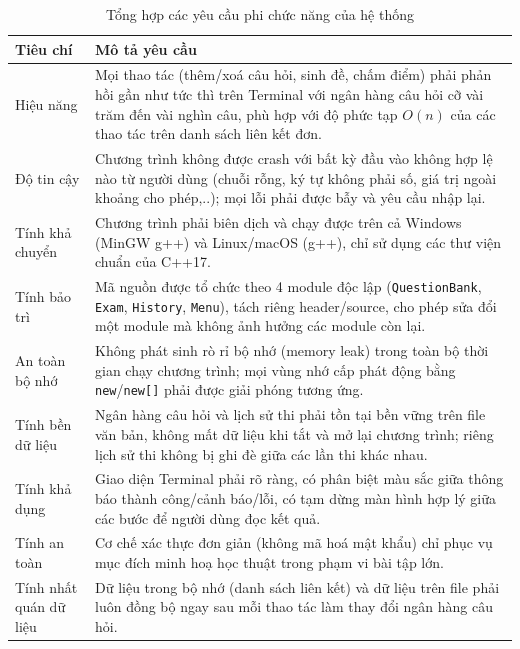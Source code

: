 \documentclass[11pt]{report}
\begin{document}
\begin{table}[H]
    \centering
    \begin{tabularx}{\textwidth}{|l|X|} \hline
        \textbf{Tiêu chí} & \textbf{Mô tả yêu cầu} \\ \hline
        Hiệu năng & Mọi thao tác (thêm/xoá câu hỏi, sinh đề, chấm điểm) phải phản hồi gần như tức thì trên Terminal với ngân hàng câu hỏi cỡ vài trăm đến vài nghìn câu, phù hợp với độ phức tạp $O(n)$ của các thao tác trên danh sách liên kết đơn. \\ \hline
        Độ tin cậy & Chương trình không được crash với bất kỳ đầu vào không hợp lệ nào từ người dùng (chuỗi rỗng, ký tự không phải số, giá trị ngoài khoảng cho phép,..); mọi lỗi phải được bẫy và yêu cầu nhập lại. \\ \hline
        Tính khả chuyển & Chương trình phải biên dịch và chạy được trên cả Windows (MinGW g++) và Linux/macOS (g++), chỉ sử dụng các thư viện chuẩn của C++17. \\ \hline
        Tính bảo trì & Mã nguồn được tổ chức theo 4 module độc lập (\texttt{QuestionBank}, \texttt{Exam}, \texttt{History}, \texttt{Menu}), tách riêng header/source, cho phép sửa đổi một module mà không ảnh hưởng các module còn lại. \\ \hline
        An toàn bộ nhớ & Không phát sinh rò rỉ bộ nhớ (memory leak) trong toàn bộ thời gian chạy chương trình; mọi vùng nhớ cấp phát động bằng \texttt{new}/\texttt{new[]} phải được giải phóng tương ứng. \\ \hline
        Tính bền dữ liệu & Ngân hàng câu hỏi và lịch sử thi phải tồn tại bền vững trên file văn bản, không mất dữ liệu khi tắt và mở lại chương trình; riêng lịch sử thi không bị ghi đè giữa các lần thi khác nhau. \\ \hline
        Tính khả dụng & Giao diện Terminal phải rõ ràng, có phân biệt màu sắc giữa thông báo thành công/cảnh báo/lỗi, có tạm dừng màn hình hợp lý giữa các bước để người dùng đọc kết quả. \\ \hline
        Tính an toàn & Cơ chế xác thực đơn giản (không mã hoá mật khẩu) chỉ phục vụ mục đích minh hoạ học thuật trong phạm vi bài tập lớn. \\ \hline
        Tính nhất quán dữ liệu & Dữ liệu trong bộ nhớ (danh sách liên kết) và dữ liệu trên file phải luôn đồng bộ ngay sau mỗi thao tác làm thay đổi ngân hàng câu hỏi. \\ \hline
    \end{tabularx}
    \caption{Tổng hợp các yêu cầu phi chức năng của hệ thống}
    \label{tab:nfr}
\end{table}
\end{document}
